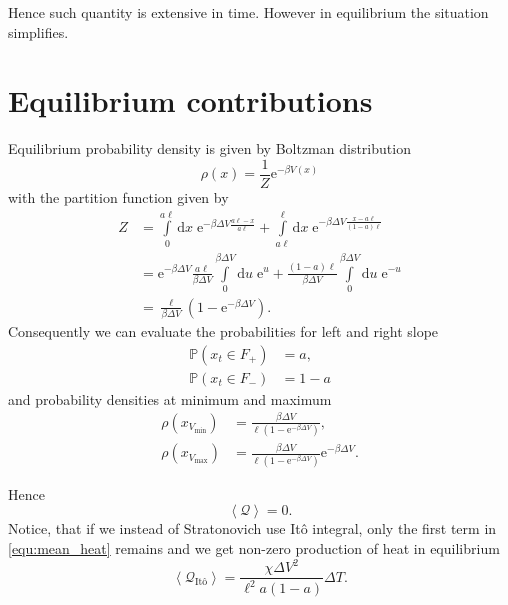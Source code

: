 \documentclass[11pt]{article}
\newcommand{\rmd}{{\mathrm d}}
\newcommand{\rme}{{\mathrm e}}
\begin{document}
Hence such quantity is extensive in time. 
However in equilibrium the situation simplifies. 

\section{Equilibrium contributions} 
Equilibrium probability density is given by Boltzman distribution
\[
\rho(x) = \frac{1}{Z} \rme^{ - \beta V(x) } 
\]
with the partition function given by
\begin{align*}
Z &= \int\limits_0^{a \ell} \rmd x \; \rme^{ - \beta \Delta V \frac{ a \ell - x }{a \ell } }
+ \int\limits_{a \ell}^\ell \rmd x \; \rme^{ - \beta \Delta V \frac{ x - a \ell }{ (1-a) \ell } } \\
&= \rme^{ - \beta \Delta V } \frac{a \ell}{\beta \Delta V} \int\limits_0^{\beta \Delta V} \rmd u \; \rme^u 
+ \frac{(1 - a) \ell}{\beta \Delta V} \int\limits_0^{\beta \Delta V} \rmd u \; \rme^{-u} \\
&= \frac{\ell}{\beta \Delta V} \left( 1 - \rme^{-\beta \Delta V} \right).
\end{align*}
Consequently we can evaluate the probabilities for left and right slope 
\begin{align*}
{\mathbb P}(x_t \in F_+) &= a, \\
{\mathbb P}(x_t \in F_-) &= 1 - a
\end{align*} 
and probability densities at minimum and maximum
\begin{align*}
\rho(x_{V_\text{min}}) &= \frac{\beta \Delta V}{\ell \left( 1 - \rme^{-\beta \Delta V}\right)}, \\
\rho(x_{V_\text{max}}) &= \frac{\beta \Delta V}{\ell \left( 1 - \rme^{-\beta \Delta V}\right)} \rme^{-\beta \Delta V}. 
\end{align*} 

Hence 
\[
\left\langle {\mathcal Q} \right\rangle = 0.
\]
Notice, that if we instead of Stratonovich use It\^{o} integral, only the first term in \eqref{equ:mean_heat} remains and we get non-zero production of heat in equilibrium 
\[
\left\langle {\mathcal Q}_\text{It\^{o}} \right\rangle = \frac{ \chi \Delta V^2}{\ell^2 a (1-a) } \Delta T. 
\]
\end{document}
